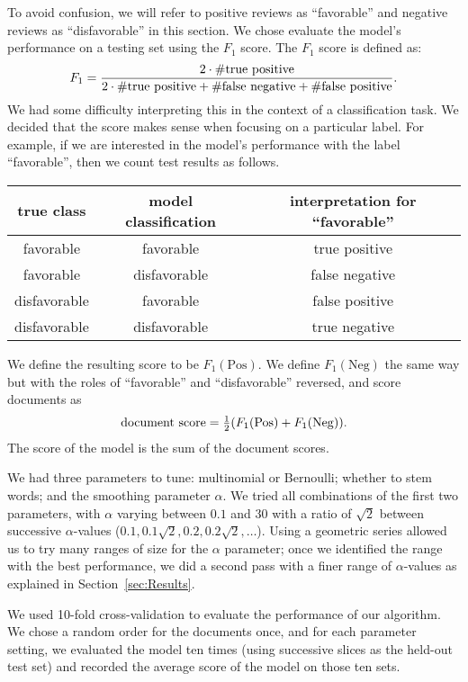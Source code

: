 \documentclass{article}
\newcommand{\PosC}{\mathrm{Pos}}
\newcommand{\NegC}{\mathrm{Neg}}
\begin{document}
To avoid confusion, we will refer to positive reviews as ``favorable'' and negative reviews as ``disfavorable'' in this section.  We chose evaluate the model's performance on a testing set using the \(F_1\) score.  The \(F_1\) score is defined as:
\[
  F_1=
  \frac
      {2\cdot\#\text{true positive}}
      {2\cdot\#\text{true positive}+\#\text{false negative}+\#\text{false positive}}
  \ldotp
\]
We had some difficulty interpreting this in the context of a classification task.
We decided that the score makes sense when focusing on a particular label.
For example, if we are interested in the model's performance with the label ``favorable'', then we count test results as follows.

\begin{tabular}{c|c|c}
  true class & model classification & interpretation for ``favorable'' \\
  \hline
  favorable & favorable & true positive \\
  favorable & disfavorable & false negative \\
  disfavorable & favorable & false positive \\
  disfavorable & disfavorable & true negative \\
\end{tabular}

We define the resulting score to be \(F_1(\PosC)\).
We define \(F_1(\NegC)\) the same way but with the roles of ``favorable'' and ``disfavorable'' reversed, and score documents as
\[\text{document score}=\tfrac12 (F_1(\PosC) + F_1(\NegC)) \ldotp\]
The score of the model is the sum of the document scores.

We had three parameters to tune: multinomial or Bernoulli; whether to stem words; and the smoothing parameter \(\alpha\).  We tried all combinations of the first two parameters, with \(\alpha\) varying between \(0.1\) and \(30\) with a ratio of \(\sqrt{2}\) between successive \(\alpha\)-values (\(0.1, 0.1\sqrt{2}, 0.2, 0.2\sqrt{2}, \dotsc\)).  Using a geometric series allowed us to try many ranges of size for the \(\alpha\) parameter; once we identified the range with the best performance, we did a second pass with a finer range of \(\alpha\)-values as explained in Section~\ref{sec:Results}.

We used 10-fold cross-validation to evaluate the performance of our algorithm.  We chose a random order for the documents once, and for each parameter setting, we evaluated the model ten times (using successive slices as the held-out test set) and recorded the average score of the model on those ten sets.
\end{document}
